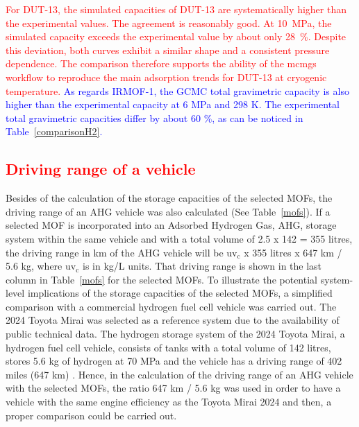 \documentclass[review]{elsarticle}
\newcommand{\uvc}{\mathrm{uv_c}}
\begin{document}
\textcolor{red}{
For DUT-13, the simulated capacities of DUT-13 are systematically higher than the 
experimental values. The agreement is reasonably good. 
At 10~MPa, the simulated capacity exceeds the experimental value by about only
28~\%. Despite this deviation, both curves exhibit a similar shape and a 
consistent pressure dependence. The comparison therefore supports the 
ability of the mcmgs workflow to reproduce the main adsorption trends for 
DUT-13 at cryogenic temperature.}
\textcolor{blue}{
As regards IRMOF-1, the GCMC total gravimetric capacity is also higher than the 
experimental capacity at 6 MPa and 298 K. The experimental total gravimetric capacities 
differ by about 60 \%, as can be noticed in Table~\ref{comparisonH2}.}



\subsection{\textcolor{red}{Driving range of a vehicle}}

Besides of the calculation of the storage capacities of the selected MOFs, 
the driving range of an AHG vehicle was also calculated (See Table~\ref{mofs}). 
If a selected MOF 
is incorporated into an Adsorbed Hydrogen Gas, AHG, storage system within 
the same vehicle and with a total volume of 2.5 x 142 = 355 litres, the 
driving range in km of the AHG vehicle will be $\uvc$ x 355 litres x 647 
km / 5.6 kg, where $\uvc$ is in kg/L units. That driving range is shown in 
the last column in Table~\ref{mofs} for the selected MOFs. To illustrate 
the potential system-level implications of the storage capacities of the 
selected MOFs, a simplified comparison with a commercial hydrogen fuel cell 
vehicle was carried out. The 2024 Toyota Mirai was selected as a reference 
system due to the availability of public technical data. The hydrogen storage 
system of the 2024 Toyota Mirai, a hydrogen fuel cell vehicle, consists of 
tanks with a total volume of 142 litres, stores 5.6 kg of hydrogen at 70 MPa 
and the vehicle has a driving range of 402 miles (647 km) \cite{toyota24}. 
Hence, in the calculation of the driving range of an AHG vehicle with the 
selected MOFs, the ratio 647 km / 5.6 kg was used in order to have a vehicle 
with the same engine efficiency as the Toyota Mirai 2024 and then, a proper 
comparison could be carried out. 
 
\end{document}
